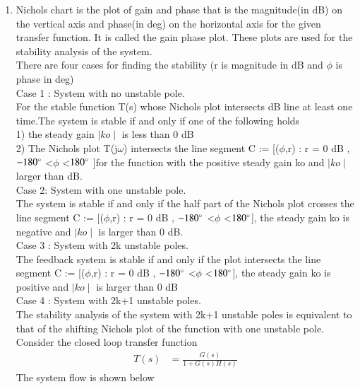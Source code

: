 \begin{enumerate}[label=\thesection.\arabic*.,ref=\thesection.\theenumi]

\item
Nichols chart is the plot of gain and phase that is the magnitude(in dB) on the vertical axis and phase(in deg) on the horizontal axis for the given transfer function. It is called the gain phase plot. These plots are used for the stability analysis of the system.
\\
There are four cases for finding the stability (r is magnitude in dB and $\phi$ is phase in deg)
\\
Case 1 : System with no unstable pole.
\\
For the stable function T(s) whose Nichols plot intersects dB line at least one time.The system is stable if and only if one of the following holds
\\
1) the steady gain $\mid ko\mid$ is less than 0 dB
\\
2) The Nichols plot T(j$\omega$) intersects the line segment C := [($\phi$,r) : r = 0 dB , $-180\degree$ \textless $\phi$ \textless $180\degree$ ]for the function with the positive steady gain ko and $\mid ko\mid$ larger than dB.
\\
Case 2: System with one unstable pole.
\\
The system is stable if and only if the half part of the Nichols plot crosses the line segment  C := [($\phi$,r) : r = 0 dB , $-180\degree$ \textless $\phi$ \textless $180\degree$], the steady gain ko is negative and $\mid ko\mid$ is larger than 0 dB.
\\
Case 3 : System with 2k unstable poles.
\\
The feedback system is stable if and only if the plot intersects the line segment C := [($\phi$,r) : r = 0 dB , $-180\degree$ \textless $\phi$ \textless $180\degree$], the steady gain ko is positive and $\mid ko\mid$  is larger than
0 dB
\\
Case 4 : System with 2k+1 unstable poles.
\\
The stability analysis of the system with 2k+1 unstable poles is equivalent to
that of the shifting Nichols plot of the function with one unstable pole.
\\
Consider the closed loop transfer function
\begin{align}
T(s) &= \frac{G(s)}{1+G(s)H(s)}
\label{eq:es17btech11009_CLTF}
\end{align}
The system flow is shown below


\end{enumerate}
